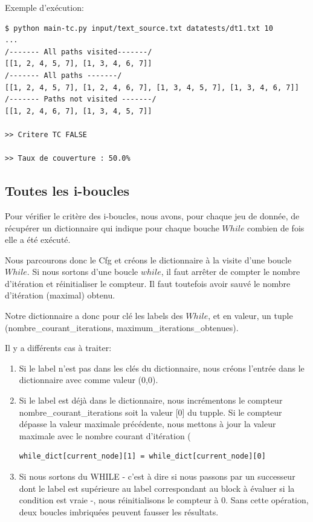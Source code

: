 \documentclass[a4paper]{article}
\begin{document}
Exemple d'exécution:
\begin{verbatim}
$ python main-tc.py input/text_source.txt datatests/dt1.txt 10
...
/------- All paths visited-------/
[[1, 2, 4, 5, 7], [1, 3, 4, 6, 7]]
/------- All paths -------/
[[1, 2, 4, 5, 7], [1, 2, 4, 6, 7], [1, 3, 4, 5, 7], [1, 3, 4, 6, 7]]
/------- Paths not visited -------/
[[1, 2, 4, 6, 7], [1, 3, 4, 5, 7]]

>> Critere TC FALSE

>> Taux de couverture : 50.0%
\end{verbatim}

\subsection{Toutes les i-boucles}

Pour vérifier le critère des i-boucles, nous avons, pour chaque jeu de donnée, de récupérer un dictionnaire qui indique pour chaque bouche $While$ combien de fois elle a été exécuté.

Nous parcourons donc le Cfg et créons le dictionnaire à la visite d'une boucle $While$. Si nous sortons d'une boucle $while$, il faut arrêter de compter le nombre d'itération et réinitialiser le compteur. Il faut toutefois avoir sauvé le nombre d'itération (maximal) obtenu.

Notre dictionnaire a donc pour clé les labels des $While$, et en valeur, un tuple (nombre\_courant\_iterations, maximum\_iterations\_obtenues). 

Il y a différents cas à traiter:
\begin{enumerate}
\item Si le label n'est pas dans les clés du dictionnaire, nous créons l'entrée dans le dictionnaire avec comme valeur (0,0).
\item Si le label est déjà dans le dictionnaire, nous incrémentons le compteur nombre\_courant\_iterations soit la valeur [0] du tupple. Si le compteur dépasse la valeur maximale précédente, nous mettons à jour la valeur maximale avec le nombre courant d'itération (  
\begin{verbatim}
while_dict[current_node][1] = while_dict[current_node][0]
\end{verbatim}
\item Si nous sortons du WHILE - c'est à dire si nous passons par un successeur dont le label est supérieure au label correspondant au block à évaluer si la condition est vraie -, nous réinitialisons le compteur à 0. Sans cette opération, deux boucles imbriquées peuvent fausser les résultats. 
\end{enumerate}
\end{document}
